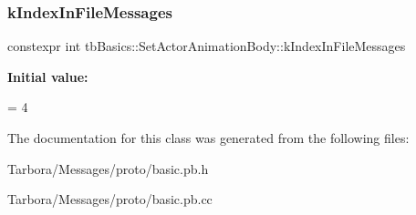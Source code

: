 \subsubsection{\texorpdfstring{k\+Index\+In\+File\+Messages}{kIndexInFileMessages}}
{\footnotesize\ttfamily constexpr int tb\+Basics\+::\+Set\+Actor\+Animation\+Body\+::k\+Index\+In\+File\+Messages\hspace{0.3cm}{\ttfamily [static]}}

{\bfseries Initial value\+:}
\begin{DoxyCode}
=
    4
\end{DoxyCode}


The documentation for this class was generated from the following files\+:\begin{DoxyCompactItemize}
\item 
Tarbora/\+Messages/proto/basic.\+pb.\+h\item 
Tarbora/\+Messages/proto/basic.\+pb.\+cc\end{DoxyCompactItemize}
